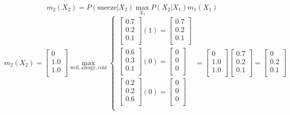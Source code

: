 \documentclass[12pt]{article}
\begin{document}
\begin{enumerate}
  \[
    m_2(X_2) = P(\text{sneeze}|X_2) \max_{X_1}{P(X_2|X_1) m_1(X_1)}
  \]
  \[
    m_2(X_2) = 
    \begin{bmatrix}
      0 \\
      1.0 \\
      1.0 \\
    \end{bmatrix}
    \max_{\text{well}, \text{allergy}, \text{cold}} 
    \begin{cases}
      \begin{bmatrix}
        0.7 \\
        0.2 \\
        0.1 \\
      \end{bmatrix} (1) = 
      \begin{bmatrix}
        0.7 \\
        0.2 \\
        0.1 \\
      \end{bmatrix}
      \\
      \begin{bmatrix}
        0.6 \\
        0.3 \\
        0.1 \\
      \end{bmatrix} (0) = 
      \begin{bmatrix}
        0 \\
        0 \\
        0 \\
      \end{bmatrix}
      \\
      \begin{bmatrix}
        0.2 \\
        0.2 \\
        0.6 \\
      \end{bmatrix} (0) =
      \begin{bmatrix}
        0 \\
        0 \\
        0 \\
      \end{bmatrix}
      \\
    \end{cases}
    =
    \begin{bmatrix}
      0 \\
      1.0 \\
      1.0 \\
    \end{bmatrix}
    \begin{bmatrix}
      0.7 \\
      0.2 \\
      0.1 \\
    \end{bmatrix}
    =
    \begin{bmatrix}
      0 \\
      0.2 \\
      0.1 \\
    \end{bmatrix}
  \]


\end{enumerate}
\end{document}
